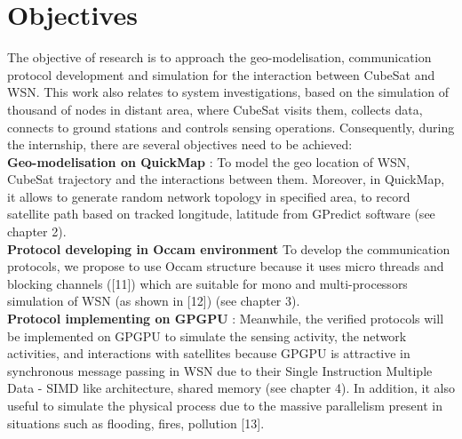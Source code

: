 \section{Objectives}
The objective of research is to approach the geo-modelisation, communication protocol development
and simulation for the interaction between CubeSat and WSN. This work also relates
to system investigations, based on the simulation of thousand of nodes in distant area, where
CubeSat visits them, collects data, connects to ground stations and controls sensing operations.
Consequently, during the internship, there are several objectives need to be achieved: \\
\textbf{Geo-modelisation on QuickMap} : To model the geo location of WSN, CubeSat trajectory and
the interactions between them. Moreover, in QuickMap, it allows to generate random network
topology in specified area, to record satellite path based on tracked longitude, latitude from GPredict
software (see chapter 2). \\
\textbf{Protocol developing in Occam environment} To develop the communication protocols, we
propose to use Occam structure because it uses micro threads and blocking channels ([11]) which
are suitable for mono and multi-processors simulation of WSN (as shown in [12]) (see chapter 3). \\
\textbf{Protocol implementing on GPGPU} : Meanwhile, the verified protocols will be implemented
on GPGPU to simulate the sensing activity, the network activities, and interactions with satellites
because GPGPU is attractive in synchronous message passing in WSN due to their Single Instruction
Multiple Data - SIMD like architecture, shared memory (see chapter 4). In addition, it also
useful to simulate the physical process due to the massive parallelism present in situations such as
flooding, fires, pollution [13].

